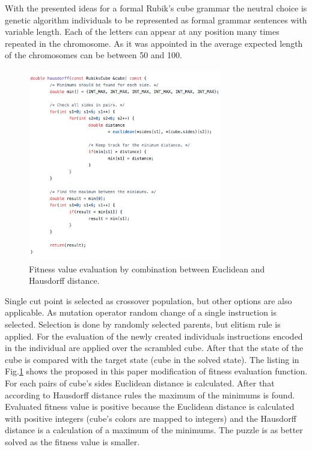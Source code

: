 \documentclass[runningheads]{llncs}
\begin{document}
With the presented ideas for a formal Rubik's cube grammar the neutral choice is genetic algorithm individuals to be represented as formal grammar sentences with variable length. Each of the letters can appear at any position many times repeated in the chromosome. As it was appointed in \cite{korf01} the average expected length of the chromosomes can be between 50 and 100.

\begin{figure}
\includegraphics[width=0.75\textwidth]{fig01.png}
\centering
\caption{Fitness value evaluation by combination between Euclidean and Hausdorff distance.} \label{fig01}
\end{figure}
\FloatBarrier

Single cut point is selected as crossover population, but other options \cite{poli01} are also applicable. As mutation operator random change of a single instruction is selected. Selection is done by randomly selected parents, but elitism rule is applied. For the evaluation of the newly created individuals instructions encoded in the individual are applied over the scrambled cube. After that the state of the cube is compared with the target state (cube in the solved state). The listing in Fig.\ref{fig01} shows the proposed in this paper modification of fitness evaluation function. For each pairs of cube's sides Euclidean distance is calculated. After that according to Hausdorff distance rules the maximum of the minimums is found. Evaluated fitness value is positive because the Euclidean distance is calculated with positive integers (cube's colors are mapped to integers) and the Hausdorff distance is a calculation of a maximum of the minimums. The puzzle is as better solved as the fitness value is smaller. 
\end{document}
